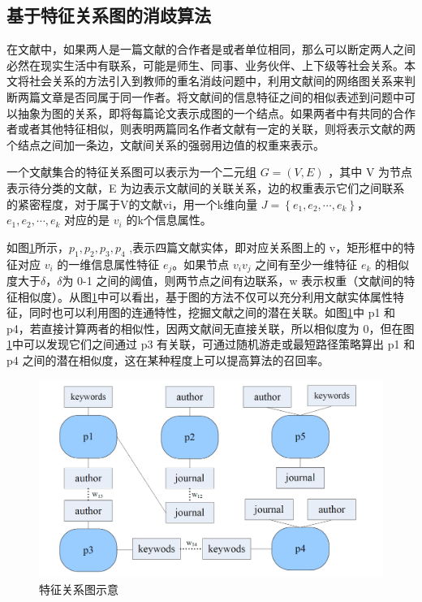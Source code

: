 \documentclass[sigchi]{acmart}
\begin{document}
\subsection{基于特征关系图的消歧算法}
在文献中，如果两人是一篇文献的合作者是或者单位相同，那么可以断定两人之间必然在现实生活中有联系，可能是师生、同事、业务伙伴、上下级等社会关系。本文将社会关系的方法引入到教师的重名消歧问题中，利用文献间的网络图关系来判断两篇文章是否同属于同一作者。将文献间的信息特征之间的相似表述到问题中可以抽象为图的关系，即将每篇论文表示成图的一个结点。如果两者中有共同的合作者或者其他特征相似，则表明两篇同名作者文献有一定的关联，则将表示文献的两个结点之间加一条边，文献间关系的强弱用边值的权重来表示。

一个文献集合的特征关系图可以表示为一个二元组 $ G= \left ( V,E\right ) $ ，其中 V 为节点表示待分类的文献，E 为边表示文献间的关联关系，边的权重表示它们之间联系的紧密程度，对于属于V的文献vi，用一个k维向量 $  J=\left \{ e_{1},e_{2},\cdots ,e_{k}\right \} $，$ e_{1},e_{2},\cdots ,e_{k}  $ 对应的是 $ v_{i} $ 的k个信息属性。

如图\ref{fig:attr}所示，$ p_{1},p_{2}, p_{3},p_{4} $ ,表示四篇文献实体，即对应关系图上的 v，矩形框中的特征对应 $ v_{i} $ 的一维信息属性特征 $ e_{j} $。如果节点 $ v_{i}v_{j}$ 之间有至少一维特征 $ e_{k} $ 的相似度大于$\delta$，$\delta$为 0-1 之间的阈值，则两节点之间有边联系，w 表示权重（文献间的特征相似度）。从图\ref{fig:attr}中可以看出，基于图的方法不仅可以充分利用文献实体属性特征，同时也可以利用图的连通特性，挖掘文献之间的潜在关联。如图\ref{fig:attr}中 p1 和 p4，若直接计算两者的相似性，因两文献间无直接关联，所以相似度为 0，但在图\ref{fig:attr}中可以发现它们之间通过 p3 有关联，可通过随机游走或最短路径策略算出 p1 和 p4 之间的潜在相似度，这在某种程度上可以提高算法的召回率。

\begin{figure}[h]
  \label{fig:attr}
  \centering
  \includegraphics[width=\linewidth]{attr}
  \caption{特征关系图示意}
  \label{fig:attr}
\end{figure}
\end{document}
